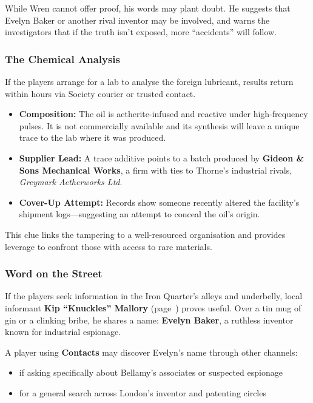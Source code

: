 While Wren cannot offer proof, his words may plant doubt. He suggests that Evelyn Baker or another rival inventor may be involved, and warns the investigators that if the truth isn’t exposed, more “accidents” will follow.

\subsubsection*{The Chemical Analysis}

If the players arrange for a lab to analyse the foreign lubricant, results return within hours via Society courier or trusted contact.

\begin{itemize}\raggedright
  \item \textbf{Composition:} The oil is aetherite-infused and reactive under high-frequency pulses. It is not commercially available and its synthesis will leave a unique trace to the lab where it was produced.
  \item \textbf{Supplier Lead:} A trace additive points to a batch produced by \textbf{Gideon \& Sons Mechanical Works}, a firm with ties to Thorne’s industrial rivals, \emph{Greymark Aetherworks Ltd}.
  \item \textbf{Cover-Up Attempt:} Records show someone recently altered the facility’s shipment logs—suggesting an attempt to conceal the oil’s origin.
\end{itemize}

This clue links the tampering to a well-resourced organisation and provides leverage to confront those with access to rare materials.


\subsubsection{Word on the Street}
If the players seek information in the Iron Quarter’s alleys and underbelly, local informant \textbf{Kip “Knuckles” Mallory} (page~\pageref{npc:kip-mallory}) proves useful. Over a tin mug of gin or a clinking bribe, he shares a name: \textbf{Evelyn Baker}, a ruthless inventor known for industrial espionage.

A player using \textbf{Contacts} may discover Evelyn’s name through other channels:
\begin{itemize}
    \item {} if asking specifically about Bellamy’s associates or suspected espionage
    \item {} for a general search across London’s inventor and patenting circles
\end{itemize}

